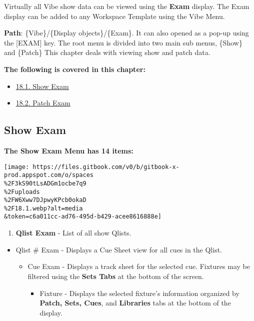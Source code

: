 \documentclass[
]{article}
\providecommand{\tightlist}{%
  \setlength{\itemsep}{0pt}\setlength{\parskip}{0pt}}
\begin{document}
Virtually all Vibe show data can be viewed using the \textbf{Exam} display. The Exam display can be added to any Workspace Template using the Vibe Menu.

\textbf{Path}: \{Vibe\}/\{Display objects\}/\{Exam\}. It can also opened as a pop-up using the {[}EXAM{]} key. The root menu is divided into two main sub menus, \{Show\} and \{Patch\} This chapter deals with viewing show and patch data.

\textbf{The following is covered in this chapter:}

\begin{itemize}
\tightlist
\item
  \href{https://vibemanual.compulite.com/exam-viewing-show-data.html\#show-exam}{18.1. Show Exam}
\item
  \href{https://vibemanual.compulite.com/exam-viewing-show-data.html\#patch-exam}{18.2. Patch Exam}
\end{itemize}

\hypertarget{show-exam}{%
\subsection{Show Exam}\label{show-exam}}

\textbf{The Show Exam Menu has 14 items:}

\texttt{[image: https://files.gitbook.com/v0/b/gitbook-x-prod.appspot.com/o/spaces\\\%2F3kS90tLsADGm1ocbe7q9\\\%2Fuploads\\\%2FW6Xww7DJpwyKPcb0okaD\\\%2F18.1.webp?alt=media\\\&token=c6a011cc-ad76-495d-b429-acee8616888e]}

\begin{enumerate}
\def\labelenumi{\arabic{enumi}.}
\tightlist
\item
  \textbf{Qlist Exam} - List of all show Qlists.
\end{enumerate}

\begin{itemize}
\item
  Qlist \# Exam - Displays a Cue Sheet view for all cues in the Qlist.

  \begin{itemize}
  \item
    Cue Exam - Displays a track sheet for the selected cue. Fixtures may be filtered using the \textbf{Sets Tabs} at the bottom of the screen.

    \begin{itemize}
    \tightlist
    \item
      Fixture - Displays the selected fixture's information organized by \textbf{Patch, Sets, Cues}, and \textbf{Libraries} tabs at the bottom of the display.
    \end{itemize}
  \end{itemize}
\end{itemize}
\end{document}
